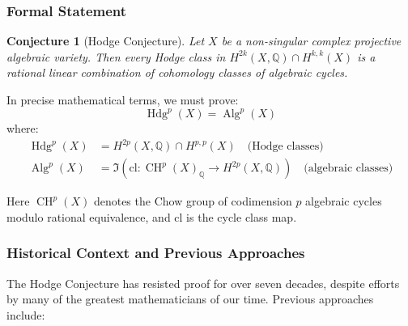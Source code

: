 \documentclass[11pt,a4paper]{article}
\theoremstyle{plain}
\newtheorem{conjecture}[theorem]{Conjecture}
\theoremstyle{definition}
\theoremstyle{remark}
\DeclareMathOperator{\Hdg}{Hdg}
\DeclareMathOperator{\Alg}{Alg}
\DeclareMathOperator{\CH}{CH}
\newcommand{\cl}{\text{cl}}
\newcommand{\Q}{\mathbb{Q}}
\begin{document}
\subsubsection{Formal Statement}

\begin{conjecture}[Hodge Conjecture]
Let $X$ be a non-singular complex projective algebraic variety. Then every Hodge class in $H^{2k}(X, \Q) \cap H^{k,k}(X)$ is a rational linear combination of cohomology classes of algebraic cycles.
\end{conjecture}

In precise mathematical terms, we must prove:
\begin{equation}
\Hdg^p(X) = \Alg^p(X)
\end{equation}
where:
\begin{align}
\Hdg^p(X) &= H^{2p}(X,\Q) \cap H^{p,p}(X) \quad \text{(Hodge classes)} \\
\Alg^p(X) &= \Im\left(\cl: \CH^p(X)_\Q \to H^{2p}(X,\Q)\right) \quad \text{(algebraic classes)}
\end{align}

Here $\CH^p(X)$ denotes the Chow group of codimension $p$ algebraic cycles modulo rational equivalence, and $\cl$ is the cycle class map.

\subsubsection{Historical Context and Previous Approaches}

The Hodge Conjecture has resisted proof for over seven decades, despite efforts by many of the greatest mathematicians of our time. Previous approaches include:
\end{document}
